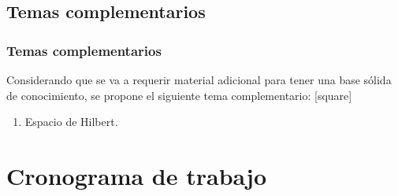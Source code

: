 \documentclass[12pt]{beamer}
\begin{document}



\subsection{Temas complementarios}

\begin{frame}
\frametitle{Temas complementarios}
Considerando que se va a requerir material adicional para tener una base sólida de conocimiento, se propone el siguiente tema complementario:
[square]
\begin{enumerate}[<+->]
\item Espacio de Hilbert.
\end{enumerate}
\end{frame}

\section{Cronograma de trabajo}
\end{document}
